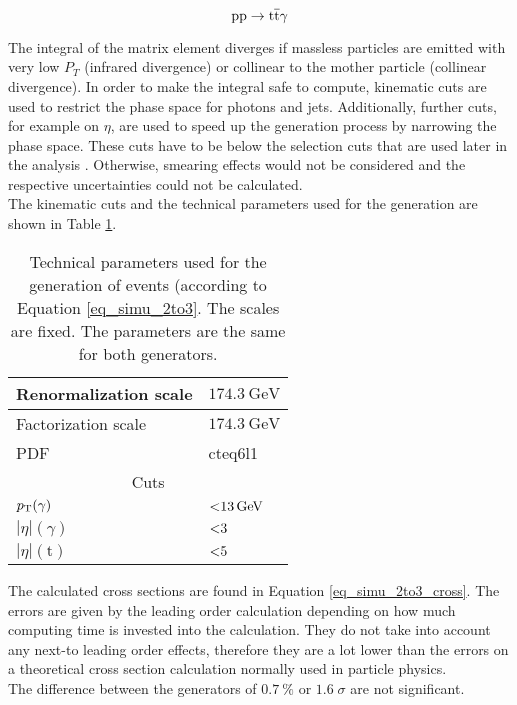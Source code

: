 \begin{equation}
\mathrm{pp} \to \mathrm{t}\overline{\mathrm{t}} \gamma
\label{eq_simu_2to3}
\end{equation}

The integral of the matrix element diverges if massless particles are emitted with very low $P_T$ (infrared divergence) or collinear to the mother particle (collinear divergence). In order to make the integral safe to compute, kinematic cuts are used to restrict the phase space for photons and jets. Additionally, further cuts, for example on $\eta$, are used to speed up the generation process by narrowing the phase space. These cuts have to be below the selection cuts that are used later in the analysis . Otherwise, smearing effects would not be considered and the respective uncertainties could not be calculated. \\
The kinematic cuts and the technical parameters used for the generation are shown in Table \ref{tab_simu_2to3}. 

\begin{table}[ht]
\centering
    \caption{Technical parameters used for the generation of \ttgamma events (according to\\ Equation \ref{eq_simu_2to3}. The scales are fixed. The parameters are the same for both generators.}
    \begin{tabular}{| l | l |}

    \hline
    Renormalization scale & $ \SI{174.3}{\giga \electronvolt} $ \\
    \hline
    Factorization scale & $ \SI{174.3}{\giga \electronvolt} $ \\
    \hline
    PDF & cteq6l1 \cite{Pumplin:2002vw} \\
    \hline
    \multicolumn{2}{|c|}{Cuts} \\
    \hline
    $p_{\mathrm{T}}(\gamma)$ & $\SI{<13}{\giga \electronvolt}$ \\
    \hline
    $| \eta |(\gamma)$ & $\num{<3}$ \\
    \hline
    $|\eta |(\mathrm{t})$ & $\num{<5}$ \\
    \hline
    \end{tabular}
     \label{tab_simu_2to3}
\end{table}

The calculated cross sections are found in Equation \ref{eq_simu_2to3_cross}. The errors are given by the leading order calculation depending on how much computing time is invested into the calculation. They do not take into account any next-to leading order effects, therefore they are a lot lower than the errors on a theoretical cross section calculation normally used in particle physics. \\
The difference between the generators of $\SI{0.7 }{\percent}$ or $ 1.6\; \sigma$ are not significant.

